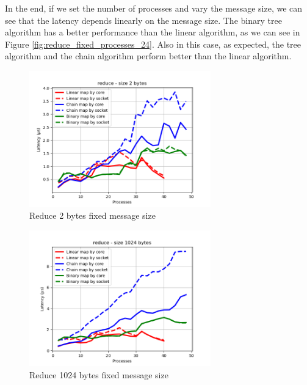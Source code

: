 In the end, if we set the number of processes and vary the message size, we can see that the latency depends linearly on the message size. The binary tree algorithm has a better performance than the linear algorithm, as we can see in Figure \ref{fig:reduce_fixed_processes_24}. Also in this case, as expected, the tree algorithm and the chain algorithm perform better than the linear algorithm.

\begin{figure}[h!]
    \centering
    \includegraphics[width=0.7\textwidth]{../plots/reduce_fixedSize2.png}
    \caption{Reduce 2 bytes fixed message size}
    \label{fig:reduce_fixed_message_size_2}
\end{figure}

\begin{figure}[h!]
    \centering
    \includegraphics[width=0.7\textwidth]{../plots/reduce_fixedSize1024.png}
    \caption{Reduce 1024 bytes fixed message size}
    \label{fig:reduce_fixed_message_size_1024}
\end{figure}

